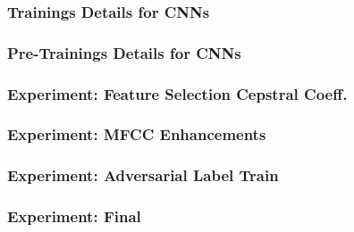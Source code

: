 \begin{frame}
  \frametitle{Trainings Details for CNNs}
  
\end{frame}

\begin{frame}
  \frametitle{Pre-Trainings Details for CNNs}
  
\end{frame}

\begin{frame}
  \frametitle{Experiment: Feature Selection Cepstral Coeff.}
  \vspace{-1cm}
  
\end{frame}

\begin{frame}
  \frametitle{Experiment: MFCC Enhancements}
  \vspace{-1cm}
  
\end{frame}

\begin{frame}
  \frametitle{Experiment: Adversarial Label Train}
  
\end{frame}

\begin{frame}
  \frametitle{Experiment: Final}
  
\end{frame}




